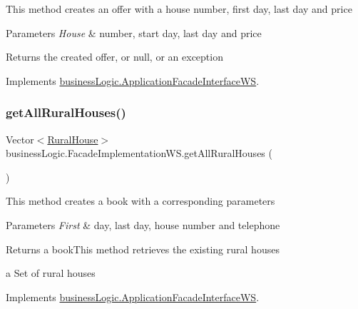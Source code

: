 This method creates an offer with a house number, first day, last day and price


\begin{DoxyParams}{Parameters}
{\em House} & number, start day, last day and price \\
\hline
\end{DoxyParams}
\begin{DoxyReturn}{Returns}
the created offer, or null, or an exception 
\end{DoxyReturn}


Implements \mbox{\hyperlink{interfacebusiness_logic_1_1_application_facade_interface_w_s_a0e8d2135ef1384a32e74f60bcea55f09}{business\+Logic.\+Application\+Facade\+Interface\+WS}}.

\mbox{\label{classbusiness_logic_1_1_facade_implementation_w_s_aa6f21ddb40ca6cd752a13e31ff016e7e}} 
\subsubsection{\texorpdfstring{getAllRuralHouses()}{getAllRuralHouses()}}
{\footnotesize\ttfamily Vector$<$\mbox{\hyperlink{classdomain_1_1_rural_house}{Rural\+House}}$>$ business\+Logic.\+Facade\+Implementation\+W\+S.\+get\+All\+Rural\+Houses (\begin{DoxyParamCaption}{ }\end{DoxyParamCaption})}

This method creates a book with a corresponding parameters


\begin{DoxyParams}{Parameters}
{\em First} & day, last day, house number and telephone \\
\hline
\end{DoxyParams}
\begin{DoxyReturn}{Returns}
a book\+This method retrieves the existing rural houses

a Set of rural houses 
\end{DoxyReturn}


Implements \mbox{\hyperlink{interfacebusiness_logic_1_1_application_facade_interface_w_s_a553cbfb37ea9f1621ba76ad8308a15da}{business\+Logic.\+Application\+Facade\+Interface\+WS}}.

